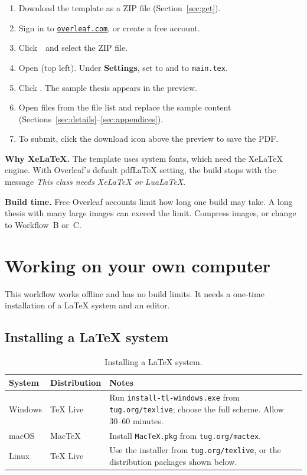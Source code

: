\documentclass[11pt,a4paper]{article}
\newcommand\file[1]{\texttt{#1}}
\newcommand\then{\,\textrightarrow\,}
\newcommand\thd[1]{\bfseries #1}
\begin{document}
\begin{enumerate}
  \item Download the template as a ZIP file (Section~\ref{sec:get}).
  \item Sign in to \href{https://www.overleaf.com}{\texttt{overleaf.com}}, or
        create a free account.
  \item Click \then{} and select the ZIP file.
  \item Open  (top left). Under \textbf{Settings}, set 
        to  and  to \file{main.tex}.
  \item Click . The sample thesis appears in the preview.
  \item Open files from the file list and replace the sample content
        (Sections~\ref{sec:details}--\ref{sec:appendices}).
  \item To submit, click the download icon above the preview to save the PDF.
\end{enumerate}

\textbf{Why XeLaTeX.} The template uses system fonts, which need the XeLaTeX
engine. With Overleaf's default pdfLaTeX setting, the build stops with the
message \emph{This class needs XeLaTeX or LuaLaTeX}.

\textbf{Build time.} Free Overleaf accounts limit how long one build may take.
A long thesis with many large images can exceed the limit. Compress images, or
change to Workflow~B or~C.

\section{Working on your own computer}\label{sec:local}

This workflow works offline and has no build limits. It needs a one-time
installation of a LaTeX system and an editor.

\subsection{Installing a LaTeX system}

\begin{table}[htbp]
\caption{Installing a LaTeX system.}
\label{tab:install}
\small
\begin{tabularx}{\textwidth}{@{}p{22mm}p{28mm}X@{}}
\toprule
\thd{System} & \thd{Distribution} & \thd{Notes} \\
\midrule
Windows & TeX Live & Run \texttt{install-tl-windows.exe} from \texttt{tug.org/texlive}; choose the full scheme. Allow 30--60 minutes. \\
macOS   & MacTeX   & Install \texttt{MacTeX.pkg} from \texttt{tug.org/mactex}. \\
Linux   & TeX Live & Use the installer from \texttt{tug.org/texlive}, or the distribution packages shown below. \\
\bottomrule
\end{tabularx}
\end{table}
\end{document}
